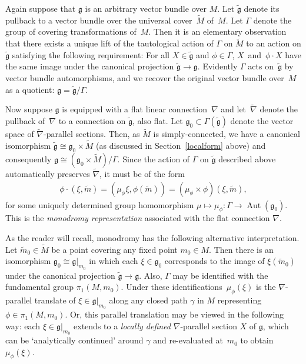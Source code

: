 \documentclass[11pt]{article}
\DeclareMathOperator{\automorphism}{Aut}
\numberwithin{equation}{section}
\begin{document}
Again suppose that $\mathfrak g$ is an arbitrary vector bundle over
$M$. Let $\tilde {\mathfrak g} $ denote its pullback to a vector
bundle over the universal cover~$\tilde M$ of~$M$. Let $\Gamma$ denote
the group of covering transformations of~$M$. Then it is an elementary
observation that there exists a unique lift of the tautological action
of $\Gamma$ on $\tilde M$ to an action on $\tilde {\mathfrak g} $
satisfying the following requirement: For all $X\in \tilde {\mathfrak
  g} $ and $\phi \in \Gamma$, $X$~and~$\phi \cdot X $ have the same
image under the canonical projection $\tilde {\mathfrak g} \rightarrow
{\mathfrak g}$. Evidently $\Gamma$ acts on~$\tilde {\mathfrak g} $ by
vector bundle automorphisms, and we recover the original vector bundle
over~$M$ as a quotient: ${\mathfrak g}=\tilde {\mathfrak g}/\Gamma $.

Now suppose $\mathfrak g$ is equipped with a f\/lat linear connection~$\nabla$ and let~$\tilde \nabla $ denote the pullback of~$\nabla $ to
a connection on $\tilde {\mathfrak g} $, also f\/lat. Let ${\mathfrak
  g}_0 \subset \Gamma(\tilde {\mathfrak g})$ denote the vector space
of $\tilde \nabla $-parallel sections. Then, as $\tilde M$ is
simply-connected, we have a canonical isomorphism $\tilde {\mathfrak
  g} \cong {\mathfrak g}_0 \times \tilde M$ (as discussed in
Section~\ref{localform} above) and consequently ${\mathfrak g} \cong
({\mathfrak g}_0 \times \tilde M)/\Gamma$.  Since the action of
$\Gamma $ on $\tilde {\mathfrak g} $ described above automatically
preserves $\tilde \nabla $, it must be of the form
\begin{gather}
  \phi \cdot (\xi, \tilde m)=(\mu_\phi \xi,\phi(\tilde m))=(\mu_\phi \times \phi)(\xi,\tilde m),\label{form}
\end{gather}
for some uniquely determined group homomorphism $\mu \mapsto \mu_\phi
\colon \Gamma \rightarrow \automorphism({\mathfrak g}_0)$. This is the
{\it mo\-nodromy representation} associated with the f\/lat connection $\nabla$.

\begin{RemarkBlaom}\label{Remark2.6}
  As the reader will recall, monodromy has the following alternative
  interpretation. Let $\tilde m_0 \in \tilde M$ be a point covering
  any f\/ixed point $m_0 \in M$. Then there is an isomorphism
  ${\mathfrak g}_0 \cong {\mathfrak g}|_{m_0}$ in which each $\xi \in
  {\mathfrak g}_0 $ corresponds to the image of $\xi(\tilde m_0)$
  under the canonical projection $\tilde {\mathfrak g} \rightarrow
  {\mathfrak g}$. Also, $\Gamma$ may be identif\/ied with the
  fundamental group $\pi_1(M,m_0)$. Under these identif\/ications~$\mu_\phi (\xi )$ is the $\nabla$-parallel translate of $\xi \in
  {\mathfrak g}|_{m_0}$ along any closed path $\gamma $ in $M$
  representing $\phi \in \pi_1(M, m_0)$. Or, this parallel translation
  may be viewed in the following way: each $\xi \in {\mathfrak
    g}|_{m_0}$ extends to a {\em locally defined} $\nabla$-parallel
  section $X$ of $\mathfrak g$, which can be `analytically
  continued' around $\gamma $ and re-evaluated at~$m_0$ to obtain
  $\mu_\phi (\xi)$.
\end{RemarkBlaom}
\end{document}
